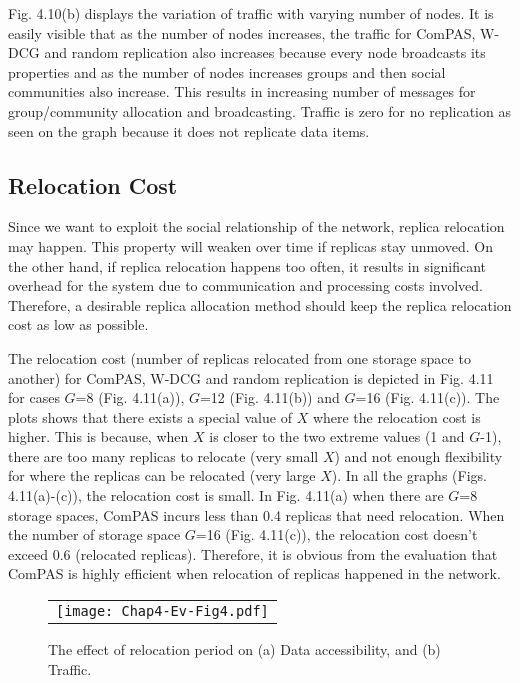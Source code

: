 Fig. 4.10(b) displays the variation of traffic with varying number of nodes. It is easily visible that as the number of nodes increases, the traffic for ComPAS, W-DCG and random replication also increases because every node broadcasts its properties and as the number of nodes increases groups and then social communities also increase. This results in increasing number of messages for group/community allocation and broadcasting. Traffic is zero for no replication as seen on the graph because it does not replicate data items.

\subsection{Relocation Cost}\label{Chap4_05_03}
Since we want to exploit the social relationship of the network, replica relocation may happen. This property will weaken over time if replicas stay unmoved. On the other hand, if replica relocation happens too often, it results in significant overhead for the system due to communication and processing costs involved. Therefore, a desirable replica allocation method should keep the replica relocation cost as low as possible.

The relocation cost (number of replicas relocated from one storage space to another) for ComPAS, W-DCG and random replication is depicted in Fig. 4.11 for cases $G$=8 (Fig. 4.11(a)), $G$=12 (Fig. 4.11(b)) and $G$=16 (Fig. 4.11(c)). The plots shows that there exists a special value of $X$ where the relocation cost is higher. This is because, when $X$ is closer to the two extreme values (1 and $G$-1), there are too many replicas to relocate (very small $X$) and not enough flexibility for where the replicas can be relocated (very large $X$). In all the graphs (Figs. 4.11(a)-(c)), the relocation cost is small. In Fig. 4.11(a) when there are $G$=8 storage spaces, ComPAS incurs less than 0.4 replicas that need relocation. When the number of storage space $G$=16 (Fig. 4.11(c)), the relocation cost doesn't exceed 0.6 (relocated replicas). Therefore, it is obvious from the evaluation that ComPAS is highly efficient when relocation of replicas happened in the network.

\begin{figure}[h]
\begin{center}
  \begin{tabular}{c}
  \texttt{[image: Chap4-Ev-Fig4.pdf]}
  \end{tabular}
  \caption{The effect of relocation period on (a) Data accessibility, and (b) Traffic.}
\end{center}
\end{figure}


